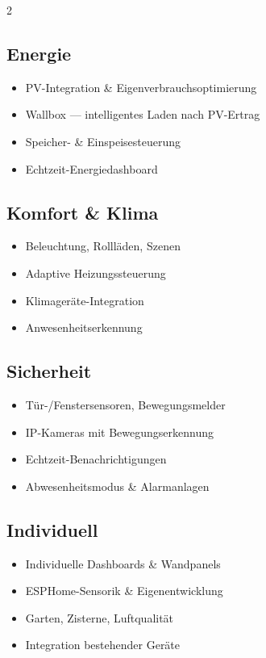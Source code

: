 \documentclass[
  fontsize=10pt,
  parskip=half,
]{scrartcl}
\begin{document}
\begin{multicols}{2}
\subsection*{\textcolor{ilm-orange}{\faSolarPanel}\; Energie}
\begin{itemize}
  \item PV-Integration \& Eigenverbrauchsoptimierung
  \item Wallbox — intelligentes Laden nach PV-Ertrag
  \item Speicher- \& Einspeisesteuerung
  \item Echtzeit-Energiedashboard
\end{itemize}

\subsection*{\textcolor{ilm-green}{\faLightbulb}\; Komfort \& Klima}
\begin{itemize}
  \item Beleuchtung, Rollläden, Szenen
  \item Adaptive Heizungssteuerung
  \item Klimageräte-Integration
  \item Anwesenheitserkennung
\end{itemize}

\columnbreak

\subsection*{\textcolor{ilm-purple}{}\; Sicherheit}
\begin{itemize}
  \item Tür-/Fenstersensoren, Bewegungsmelder
  \item IP-Kameras mit Bewegungserkennung
  \item Echtzeit-Benachrichtigungen
  \item Abwesenheitsmodus \& Alarmanlagen
\end{itemize}

\subsection*{\textcolor{ilm-blue}{\faTools}\; Individuell}
\begin{itemize}
  \item Individuelle Dashboards \& Wandpanels
  \item ESPHome-Sensorik \& Eigenentwicklung
  \item Garten, Zisterne, Luftqualität
  \item Integration bestehender Geräte
\end{itemize}
\end{multicols}
\end{document}
